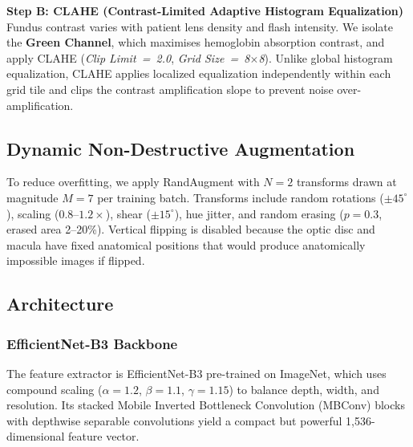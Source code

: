 \documentclass[conference]{IEEEtran}
\begin{document}
\textbf{Step B: CLAHE (Contrast-Limited Adaptive Histogram Equalization)}\\
Fundus contrast varies with patient lens density and flash intensity. We isolate the \textbf{Green Channel}, which maximises hemoglobin absorption contrast, and apply CLAHE (\textit{Clip Limit~=~2.0}, \textit{Grid Size~=~8$\times$8}). Unlike global histogram equalization, CLAHE applies localized equalization independently within each grid tile and clips the contrast amplification slope to prevent noise over-amplification.


\subsection{Dynamic Non-Destructive Augmentation}
To reduce overfitting, we apply RandAugment \cite{cubuk2020randaugment} with $N{=}2$ transforms drawn at magnitude $M{=}7$ per training batch. Transforms include random rotations (${\pm}45^\circ$), scaling ($0.8$--$1.2\times$), shear (${\pm}15^\circ$), hue jitter, and random erasing ($p{=}0.3$, erased area 2--20\%). Vertical flipping is disabled because the optic disc and macula have fixed anatomical positions that would produce anatomically impossible images if flipped.

\subsection{Architecture}

\subsubsection{EfficientNet-B3 Backbone}
The feature extractor is EfficientNet-B3 \cite{tan2019efficientnet} pre-trained on ImageNet, which uses compound scaling ($\alpha{=}1.2$, $\beta{=}1.1$, $\gamma{=}1.15$) to balance depth, width, and resolution. Its stacked Mobile Inverted Bottleneck Convolution (MBConv) blocks with depthwise separable convolutions yield a compact but powerful 1,536-dimensional feature vector.
\end{document}
